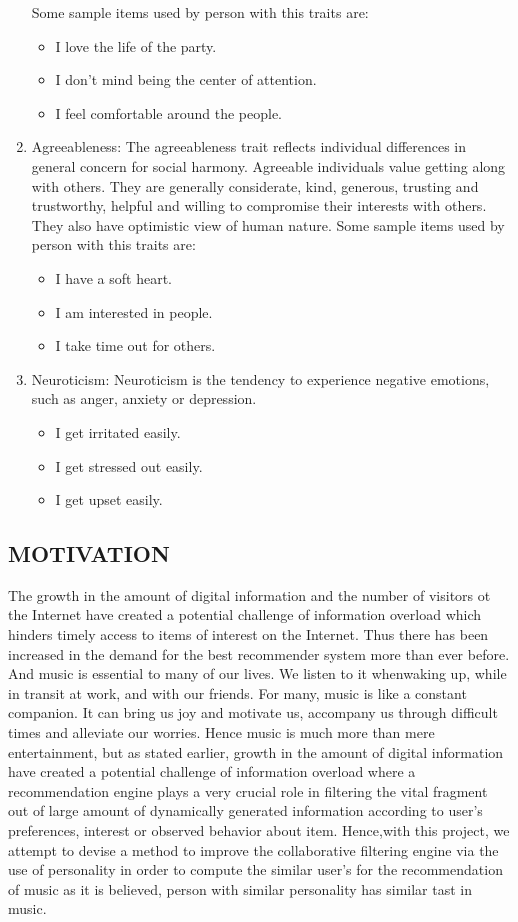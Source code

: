 \begin{enumerate}
Some sample items used by person with this traits are:
\begin{itemize}
	\item I love the life of the party.
	\item I don't mind being the center of attention.
	\item I feel comfortable around the people.
\end{itemize}
\item Agreeableness: The agreeableness trait reflects individual differences in general concern for social harmony. Agreeable individuals value getting along with others. They are generally considerate, kind, generous, trusting and trustworthy, helpful and willing to compromise their interests with others. They also have optimistic view of human nature.
Some sample items used by person with this traits are:
\begin{itemize}
	\item I have a soft heart.
	\item I am interested in people.
	\item I take time out for others.
\end{itemize}
\item Neuroticism: Neuroticism is the tendency to experience negative emotions, such as anger, anxiety or depression.
\begin{itemize}
	\item I get irritated easily.
	\item I get stressed out easily.
	\item I get upset easily.
\end{itemize}
\end{enumerate}
\subsection{MOTIVATION}
The growth in the amount of digital information and the number of visitors ot the Internet have created a potential challenge of information overload which hinders timely access to items of interest on the Internet. Thus there has been increased in the demand for the best recommender system more than ever before. And music is essential to many of our lives. We listen to it whenwaking up, while in transit at work, and with our friends. For many, music is like a constant companion. It can bring us joy and motivate us, accompany us through difficult times and alleviate our worries. Hence music is much more than mere entertainment, but as stated earlier, growth in the amount of digital information have created a potential challenge of information overload where a recommendation engine plays a very crucial role in filtering the vital fragment out of large amount of dynamically generated information according to user's preferences, interest or observed behavior about item. 
Hence,with this project, we attempt to devise a method to improve the collaborative filtering engine via the use of personality in order to compute the similar user's for the recommendation of music as it is believed, person with similar personality has similar tast in music. 

